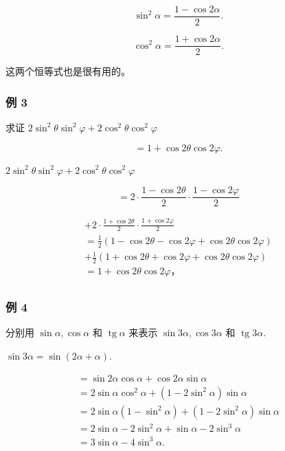 \[
\sin^ {2} \alpha = \frac {1 - \cos 2 \alpha}{2}.
\]

\[
\cos^ {2} \alpha = \frac {1 + \cos 2 \alpha}{2}.
\]

这两个恒等式也是很有用的。

\subsubsection{例 3}

求证 \(2\sin^{2}\theta\sin^{2}\varphi+2\cos^{2}\theta\cos^{2}\varphi\)

\[
= 1 + \cos 2 \theta \cos 2 \varphi .
\]

\(2\sin^2\theta \sin^2\varphi + 2\cos^2\theta \cos^2\varphi\)

\[
= 2 \cdot \frac {1 - \cos 2 \theta}{2} \cdot \frac {1 - \cos 2 \varphi}{2}
\]

\[
\begin{array}{l} + 2 \cdot \frac {1 + \cos 2 \theta}{2} \cdot \frac {1 + \cos 2 \varphi}{2} \\ = \frac {1}{2} (1 - \cos 2 \theta - \cos 2 \varphi + \cos 2 \theta \cos 2 \varphi) \\ + \frac {1}{2} (1 + \cos 2 \theta + \cos 2 \varphi + \cos 2 \theta \cos 2 \varphi) \\ = 1 + \cos 2 \theta \cos 2 \varphi \text{，} \\ \end{array}
\]

\subsubsection{例 4}

分别用 \(\sin\alpha,\cos\alpha\) 和 \(\operatorname{tg}\alpha\) 来表示
\(\sin3\alpha,\cos3\alpha\) 和 \(\operatorname{tg}3\alpha.\)

 \(\sin 3\alpha = \sin (2\alpha + \alpha)\).

\[
\begin{array}{l} = \sin 2 \alpha \cos \alpha + \cos 2 \alpha \sin \alpha \\ = 2 \sin \alpha \cos^ {2} \alpha + (1 - 2 \sin^ {2} \alpha) \sin \alpha \\ = 2 \sin \alpha (1 - \sin^ {2} \alpha) + (1 - 2 \sin^ {2} \alpha) \sin \alpha \\ = 2 \sin \alpha - 2 \sin^ {2} \alpha + \sin \alpha - 2 \sin^ {3} \alpha \\ = 3 \sin \alpha - 4 \sin^ {3} \alpha . \\ \end{array}
\]

